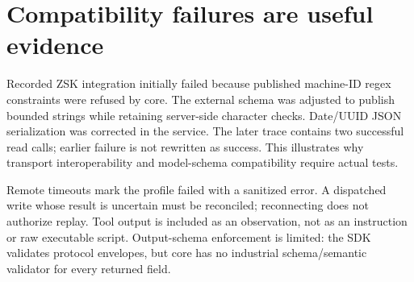 \section{Compatibility failures are useful evidence}
Recorded ZSK integration initially failed because published machine-ID regex constraints were refused by core. The external schema was adjusted to publish bounded strings while retaining server-side character checks. Date/UUID JSON serialization was corrected in the service. The later trace contains two successful read calls; earlier failure is not rewritten as success. This illustrates why transport interoperability and model-schema compatibility require actual tests.

Remote timeouts mark the profile failed with a sanitized error. A dispatched write whose result is uncertain must be reconciled; reconnecting does not authorize replay. Tool output is included as an observation, not as an instruction or raw executable script. Output-schema enforcement is limited: the SDK validates protocol envelopes, but core has no industrial schema/semantic validator for every returned field.

